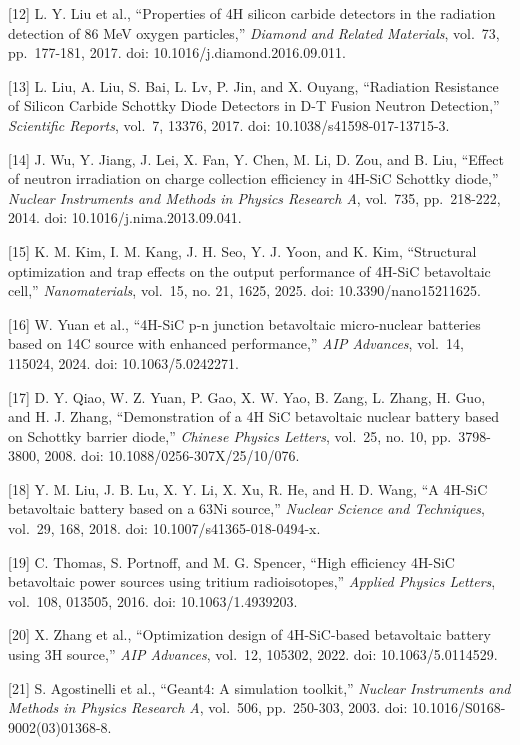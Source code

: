 \documentclass[
  10pt,
  a4paper,
]{article}
\begin{document}
{[}12{]} L. Y. Liu et al., ``Properties of 4H silicon carbide detectors
in the radiation detection of 86 MeV oxygen particles,'' \emph{Diamond
and Related Materials}, vol.~73, pp.~177-181, 2017. doi:
10.1016/j.diamond.2016.09.011.

{[}13{]} L. Liu, A. Liu, S. Bai, L. Lv, P. Jin, and X. Ouyang,
``Radiation Resistance of Silicon Carbide Schottky Diode Detectors in
D-T Fusion Neutron Detection,'' \emph{Scientific Reports}, vol.~7,
13376, 2017. doi: 10.1038/s41598-017-13715-3.

{[}14{]} J. Wu, Y. Jiang, J. Lei, X. Fan, Y. Chen, M. Li, D. Zou, and B.
Liu, ``Effect of neutron irradiation on charge collection efficiency in
4H-SiC Schottky diode,'' \emph{Nuclear Instruments and Methods in
Physics Research A}, vol.~735, pp.~218-222, 2014. doi:
10.1016/j.nima.2013.09.041.

{[}15{]} K. M. Kim, I. M. Kang, J. H. Seo, Y. J. Yoon, and K. Kim,
``Structural optimization and trap effects on the output performance of
4H-SiC betavoltaic cell,'' \emph{Nanomaterials}, vol.~15, no. 21, 1625,
2025. doi: 10.3390/nano15211625.

{[}16{]} W. Yuan et al., ``4H-SiC p-n junction betavoltaic micro-nuclear
batteries based on 14C source with enhanced performance,'' \emph{AIP
Advances}, vol.~14, 115024, 2024. doi: 10.1063/5.0242271.

{[}17{]} D. Y. Qiao, W. Z. Yuan, P. Gao, X. W. Yao, B. Zang, L. Zhang,
H. Guo, and H. J. Zhang, ``Demonstration of a 4H SiC betavoltaic nuclear
battery based on Schottky barrier diode,'' \emph{Chinese Physics
Letters}, vol.~25, no. 10, pp.~3798-3800, 2008. doi:
10.1088/0256-307X/25/10/076.

{[}18{]} Y. M. Liu, J. B. Lu, X. Y. Li, X. Xu, R. He, and H. D. Wang,
``A 4H-SiC betavoltaic battery based on a 63Ni source,'' \emph{Nuclear
Science and Techniques}, vol.~29, 168, 2018. doi:
10.1007/s41365-018-0494-x.

{[}19{]} C. Thomas, S. Portnoff, and M. G. Spencer, ``High efficiency
4H-SiC betavoltaic power sources using tritium radioisotopes,''
\emph{Applied Physics Letters}, vol.~108, 013505, 2016. doi:
10.1063/1.4939203.

{[}20{]} X. Zhang et al., ``Optimization design of 4H-SiC-based
betavoltaic battery using 3H source,'' \emph{AIP Advances}, vol.~12,
105302, 2022. doi: 10.1063/5.0114529.

{[}21{]} S. Agostinelli et al., ``Geant4: A simulation toolkit,''
\emph{Nuclear Instruments and Methods in Physics Research A}, vol.~506,
pp.~250-303, 2003. doi: 10.1016/S0168-9002(03)01368-8.
\end{document}
